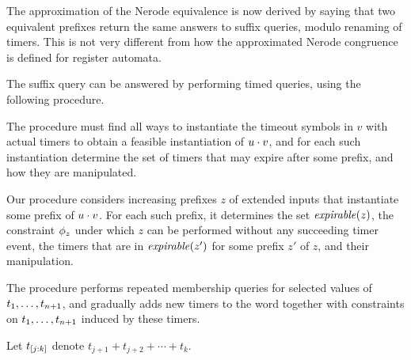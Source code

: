     The approximation of the Nerode equivalence is now derived by saying that
    two equivalent prefixes return the same answers to suffix queries, modulo
    renaming of timers. This is not very different from how the approximated
    Nerode congruence is defined for register automata.


The suffix query can be answered by performing timed queries, using the
following procedure.

The procedure must find all ways to instantiate the timeout symbols in $v$
with actual timers to obtain a feasible instantiation of $u\cdot v$, and for
each such instantiation determine the set of timers that may expire after some
prefix, and how they are manipulated.

Our procedure considers increasing prefixes $z$ of extended inputs that
instantiate some prefix of $u \cdot v$. For each such prefix, it
determines the set $\mathit{expirable}(z)$, the constraint $\phi_{z}$
under which $z$ can be performed without any succeeding timer event, 
the timers that are in $\mathit{expirable}(z')$ for some prefix $z'$ of $z$, and
their manipulation.

The procedure performs repeated membership queries for selected values
of ${t}_1 , \ldots , {t}_{n+1}$, and gradually adds new timers to the word together
with constraints on ${t}_1 , \ldots , {t}_{n+1}$ induced by these timers.

Let $t_{[j:k]}$ denote $t_{j+1} + t_{j+2} + \cdots + t_k$.


